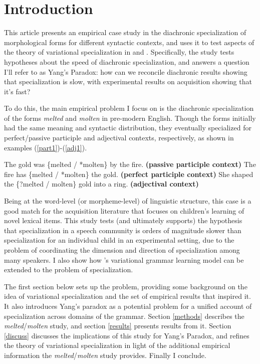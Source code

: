 \documentclass{artikel3}
\begin{document}
\section{Introduction}
\label{intro}

This article presents an empirical case study in the diachronic specialization of morphological forms for different syntactic contexts, and uses it to test aspects of the theory of variational specialization in \citet{wallenberg2016} and \citet{fruehwaldwallenberginprep}. Specifically, the study tests hypotheses about the speed of diachronic specialization, and answers a question I'll refer to as Yang's Paradox: how can we reconcile diachronic results showing that specialization is slow, with experimental results on acquisition showing that it's fast?

To do this, the main empirical problem I focus on is the diachronic specialization of the forms \textsl{melted} and \textsl{molten} in pre-modern English. Though the forms initially had the same meaning and syntactic distribution, they eventually specialized for perfect/passive participle and adjectival contexts, respectively, as shown in examples (\ref{part1})-(\ref{adj1}).

\begin{exe}
	\ex \label{part1} The gold was \{melted / *molten\} by the fire. \textbf{(passive participle context)}
	\ex \label{part2} The fire has \{melted / *molten\} the gold. \textbf{(perfect participle context)}
	\ex \label{adj1} She shaped the \{?melted / molten\} gold into a ring. \textbf{(adjectival context)}
\end{exe}

\noindent Being at the word-level (or morpheme-level) of linguistic structure, this case is a good match for the acquisition literature that focuses on children's learning of novel lexical items. This study tests (and ultimately supports) the hypothesis that specialization in a speech community is orders of magnitude slower than specialization for an individual child in an experimental setting, due to the problem of coordinating the dimension and direction of specialization among many speakers. I also show how \citet{yang2000}'s variational grammar learning model can be extended to the problem of specialization.

The first section below sets up the problem, providing some background on the idea of variational specialization and the set of empirical results that inspired it. It also introduces Yang's paradox as a potential problem for a unified account of specialization across domains of the grammar. Section \ref{methods} describes the \textsl{melted}/\textsl{molten} study, and section \ref{results} presents results from it. Section \ref{discuss} discusses the implications of this study for Yang's Paradox, and refines the theory of variational specialization in light of the additional empirical information the \textsl{melted}/\textsl{molten} study provides. Finally I conclude.
\end{document}
